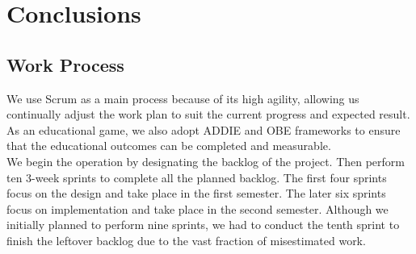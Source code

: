 \documentclass[12pt,oneside,openright,a4paper]{cpe-english-project}
\begin{document}
%
\chapter{Conclusions}
%
%

\section{Work Process}
We use Scrum as a main process because of its high agility, allowing us continually adjust the work plan to suit the current progress and expected result. As an educational game, we also adopt ADDIE and OBE frameworks to ensure that the educational outcomes can be completed and measurable. \\
We begin the operation by designating the backlog of the project. Then perform ten 3-week sprints to complete all the planned backlog. The first four sprints focus on the design and take place in the first semester. The later six sprints focus on implementation and take place in the second semester. Although we initially planned to perform nine sprints, we had to conduct the tenth sprint to finish the leftover backlog due to the vast fraction of misestimated work.


\end{document}
